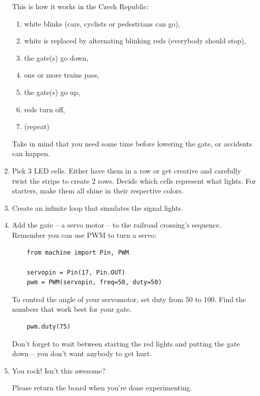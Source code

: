 \documentclass{../tutorial}
\begin{document}
\begin{enumerate}
    This is how it works in the Czech Republic:

    \begin{enumerate}
    \item white blinks (cars, cyclists or pedestrians can go),
    \item white is replaced by alternating blinking reds
          (everybody should stop),
    \item the gate(s) go down,
    \item one or more trains pass,
    \item the gate(s) go up,
    \item reds turn off,
    \item (repeat)
    \end{enumerate}

    Take in mind that you need some time before lowering the gate,
    or accidents can happen.

\item
    Pick 3 LED cells.
    Either have them in a row or get creative and carefully twist the stripe
    to create 2 rows.
    Decide which cells represent what lights.
    For starters, make them all shine in their respective colors.

\item
    Create an infinite loop that simulates the signal lights.

\item
    Add the gate – a servo motor – to the railroad crossing's sequence.
    Remember you can use PWM to turn a servo:

    \begin{lstlisting}
    from machine import Pin, PWM

    servopin = Pin(17, Pin.OUT)
    pwm = PWM(servopin, freq=50, duty=50)
    \end{lstlisting}

    To control the angle of your servomotor, set duty from 50 to 100.
    Find the numbers that work best for your gate.

    \begin{lstlisting}
    pwm.duty(75)
    \end{lstlisting}

    Don't forget to wait between starting the red lights and putting the gate down –
    you don't want anybody to get hurt.

\item
    You rock! Isn't this awesome?

    Please return the board when you're done experimenting.

\end{enumerate}
\end{document}
